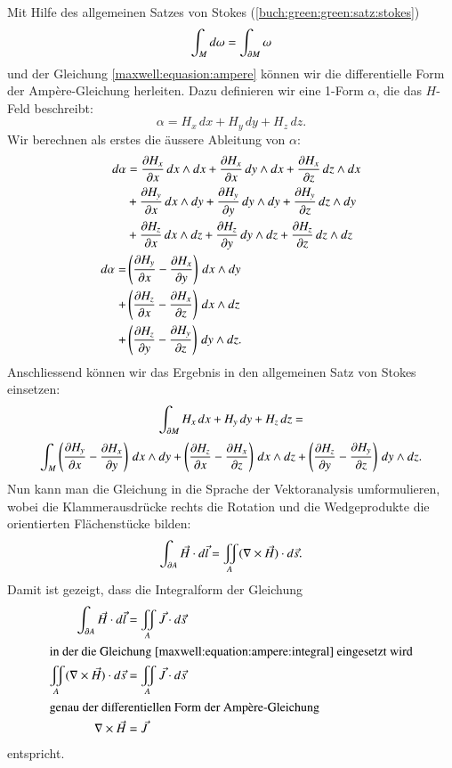 Mit Hilfe des allgemeinen Satzes von Stokes (\ref{buch:green:green:satz:stokes})
\[
\int_{M} d\omega
=
\int_{\d M} \omega
\]
und der Gleichung \eqref{maxwell:equasion:ampere} können wir die differentielle Form der Ampère-Gleichung herleiten.
Dazu definieren wir eine 1-Form $\alpha$, die das $H$-Feld beschreibt:
\[
\alpha
=
H_x \, dx + H_y \, dy + H_z \, dz . 
\]
Wir berechnen als erstes die äussere Ableitung von $\alpha$:
\begin{align*}
	d\alpha 
	&=
	\frac{\d H_x}{\d x} \, dx \wedge dx + \frac{\d H_x}{\d x} \, dy \wedge dx + \frac{\d H_x}{\d z} \, dz \wedge dx
	\\
	&+
	\frac{\d H_y}{\d x} \, dx \wedge dy + \frac{\d H_y}{\d y} \, dy \wedge dy + \frac{\d H_y}{\d z} \, dz \wedge dy
	\\
	&+
	\frac{\d H_z}{\d x} \, dx \wedge dz + \frac{\d H_z}{\d y} \, dy \wedge dz + \frac{\d H_z}{\d z} \, dz \wedge dz
	\\
	d\alpha
	=
	&\left(\frac{\d H_y}{\d x} - \frac{\d H_x}{\d y}\right) \, dx \wedge dy
	\\
	+
	&\left(\frac{\d H_z}{\d x} - \frac{\d H_x}{\d z}\right) \, dx \wedge dz
	\\
	+
	&\left(\frac{\d H_z}{\d y} - \frac{\d H_y}{\d z}\right) \, dy \wedge dz .
\end{align*}
Anschliessend können wir das Ergebnis in den allgemeinen Satz von Stokes einsetzen:
\[
\int_{\d M} H_x \, dx + H_y \, dy + H_z \, dz
=
\]
\[
\int_{M} \left(\frac{\d H_y}{\d x} - \frac{\d H_x}{\d y}\right) \, dx \wedge dy
+
\left(\frac{\d H_z}{\d x} - \frac{\d H_x}{\d z}\right) \, dx \wedge dz
+
\left(\frac{\d H_z}{\d y} - \frac{\d H_y}{\d z}\right) \, dy \wedge dz .
\]
Nun kann man die Gleichung in die Sprache der Vektoranalysis umformulieren, wobei die Klammerausdrücke rechts die Rotation und die Wedgeprodukte die orientierten Flächenstücke bilden: 
%
\begin{equation}
\label{maxwell:equation:ampere:integral}
\int_{\d A} \vec{H} \cdot d\vec{l}
=
\iint_{A} (\nabla \times \vec{H}) \cdot d\vec{s} .
\end{equation}
Damit ist gezeigt, dass die Integralform der Gleichung
\begin{align}
	\int_{\d A}
	\vec{H} \cdot d\vec{l}
	&=
	\iint_{A}
	\vec{J} \cdot d\vec{s}
	\notag
	\\
	\intertext{in der die Gleichung \eqref{maxwell:equation:ampere:integral} eingesetzt wird}
	\iint_{A}
	(
	\nabla \times \vec{H}
	)
	\cdot
	d\vec{s}
	&=
	\iint_{A}
	\vec{J} \cdot d\vec{s}
	\label{maxwell:equation:ampere:differential}
	\\
	\intertext{genau der differentiellen Form der Ampère-Gleichung}
	\nabla \times \vec{H}
	&=
	\vec{J} 
\end{align}
entspricht.

